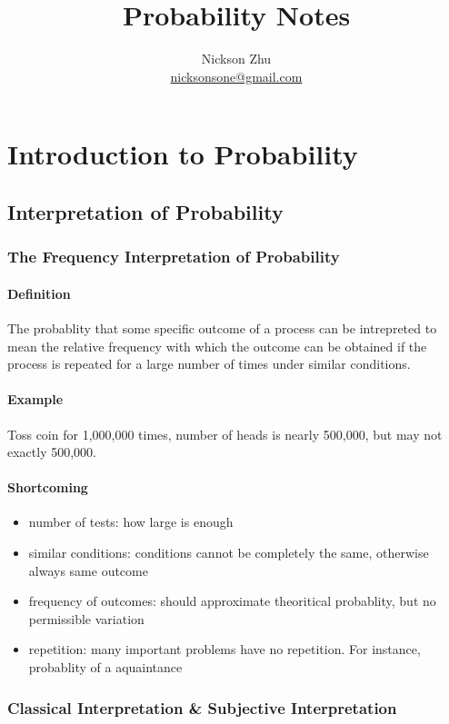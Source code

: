 \documentclass{book}
\title{Probability Notes}
\author{Nickson Zhu  \\  \url{nicksonsone@gmail.com}}
\begin{document}
\maketitle
\tableofcontents
\newpage

\chapter{Introduction to Probability}
	\section{Interpretation of Probability}
		\subsection{The Frequency Interpretation of Probability}
			\subsubsection{Definition}
			The probablity that some specific outcome of a process can be intrepreted to 
			mean the relative frequency with which the outcome can be obtained if the 
			process is repeated for a large number of times under similar conditions.  

			\subsubsection{Example}
			Toss coin for 1,000,000 times, number of heads is nearly 500,000, but may 
			not exactly 500,000.

			\subsubsection{Shortcoming} 
			\begin{itemize}
				\item number of tests: how large is enough 
				\item similar conditions: conditions cannot be completely the same, otherwise always same outcome
				\item frequency of outcomes: should approximate theoritical probablity, but no permissible variation
				\item repetition: many important problems have no repetition. For instance, probablity of a aquaintance 
			\end{itemize}

		\subsection{Classical Interpretation \& Subjective Interpretation}
\end{document}
